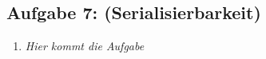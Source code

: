 \subsection{Aufgabe 7: (Serialisierbarkeit)}
\label{sec:Aufgabe7}
\begin{enumerate}[label=\alph*)]
    \item \textit{Hier kommt die Aufgabe}
\end{enumerate}